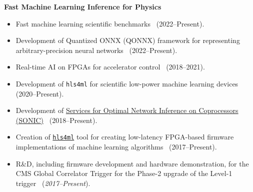 \documentclass[11pt]{res}
\begin{document}
\begin{resume}
  \textbf{Fast Machine Learning Inference for Physics}
  \begin{itemize}
    \itemsep-0.3em
    \item Fast machine learning scientific benchmarks~\cite{Duarte:2022hdp} (2022--Present).
    \item Development of Quantized ONNX (QONNX) framework for representing arbitrary-precision neural networks~\cite{Pappalardo:2022nxk} (2022--Present).
    \item Real-time AI on FPGAs for accelerator control~\cite{John:2020sak} ({2018--2021}).
    \item Development of \texttt{hls4ml} for scientific low-power machine learning devices~\cite{Campos:2023pkp,Weng:2023tailor,Hussain:2022faststamp,Borras:2022opensource,Banbury:2021mlperf,DiGuglielmo:2021ide,Hawks:2021ruw,Fahim:2021cic} ({2020--Present}).
    \item Development of \href{https://github.com/fastmachinelearning/SonicCMS}{Services for Optimal Network Inference on Coprocessors (SONIC)}~\cite{Krupa:2020bwg,Rankin:2020usv,neurips2019_sonic,Duarte:2019fta} ({2018--Present}).
    \item Creation of \href{https://fastmachinelearning.org/hls4ml/}{\texttt{hls4ml}} tool for creating low-latency FPGA-based firmware implementations of machine learning algorithms~\cite{Deiana:2021niw,Elabd:2021lgo,Govorkova:2021utb,Iiyama:2020wap,Heintz:2020soy,DiGuglielmo:2020eqx,Summers:2020xiy,neurips2019_hls4ml,Duarte:2018ite} ({2017--Present}).
    \item R\&D, including firmware development and hardware demonstration, for the CMS Global Correlator Trigger for the Phase-2 upgrade of the Level-1 trigger~\cite{CERN-LHCC-2020-004} (\emph{2017--Present}).
  \end{itemize}

\end{resume}
\end{document}

